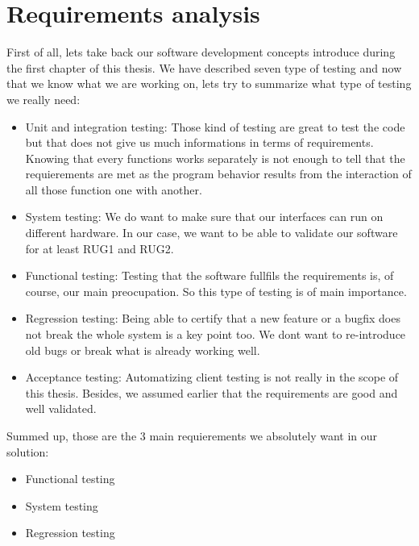 \documentclass[12pt]{article}
\theoremstyle{definition}
\theoremstyle{definition}
\theoremstyle{remark}
\begin{document}
\clearpage



\section{Requirements analysis}


First of all, lets take back our software development concepts introduce during the first chapter of this thesis. We have described seven type of testing and now that we know what we are working on, lets try to summarize what type of testing we really need:\\

\begin{itemize}
\item Unit and integration testing: Those kind of testing are great to test the code but that does not give us much informations in terms of requirements. Knowing that every functions works separately is not enough to tell that the requierements are met as the program behavior results from the interaction of all those function one with another.
\item System testing: We do want to make sure that our interfaces can run on different hardware. In our case, we want to be able to validate our software for at least RUG1 and RUG2.
\item Functional testing: Testing that the software fullfils the requirements is, of course, our main preocupation. So this type of testing is of main importance.
\item Regression testing: Being able to certify that a new feature or a bugfix does not break the whole system is a key point too. We dont want to re-introduce old bugs or break what is already working well.
\item Acceptance testing: Automatizing client testing is not really in the scope of this thesis. Besides, we assumed earlier that the requirements are good and well validated.
\end{itemize}

Summed up, those are the 3 main requierements we absolutely want in our solution:

\begin{itemize}
\item Functional testing
\item System testing
\item Regression testing
\end{itemize}
\end{document}
